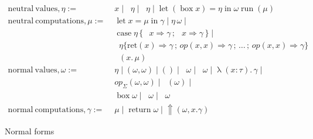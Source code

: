 \documentclass[acmsmall, screen, nonacm]{acmart}
\theoremstyle{definition}
\newcommand{\reflectname}{\Uparrow}
\newcommand{\performraw}[2]{\mathop{\reflectname(#1(#2))}}
\newcommand{\perform}[5]{\performraw{#1}{#2}(#3, #4. #5)}
\newcommand{\reifyname}{\Downarrow}
\newcommand{\reifyraw}[1]{\mathop{\reifyname_{#1}}}
\newcommand{\reify}[3]{\reifyraw{#1}(#2.\,#3)}
\newcommand{\outl}[1]{\mathop{\mathrm{out}_L} #1}
\newcommand{\outr}[1]{\mathop{\mathrm{out}_R} #1}
\newcommand{\indintro}[4]{#2_{#1}(#3, #4)}
\newcommand{\retname}{\mathrm{ret}}
\newcommand{\ret}[2]{\mathop{\retname_{#1}}(#2)}
\newcommand{\indelim}[3]{\mathop{\mathrm{rec}_{#1}} #2 \{#3\}}
\newcommand{\indretcase}[2]{\retname(#1) \Rightarrow #2}
\newcommand{\indcase}[4]{#1(#2, #3) \Rightarrow #4}
\newcommand{\seq}{\,;\,}
\newcommand{\fst}{\mathop{\pi_1}}
\newcommand{\snd}{\mathop{\pi_2}}
\newcommand{\inl}[1]{\mathop{\mathrm{in}_L} #1}
\newcommand{\inr}[1]{\mathop{\mathrm{in}_R} #1}
\newcommand{\case}[5]{\mathop{\mathrm{case}} #1 \,\{\,\inl{#2} \Rightarrow #3 \seq \inr{#4} \Rightarrow #5 \,\}}
\newcommand{\abs}[3]{\mathop{\lambda}(#1 \types #2).\,#3}
\newcommand{\app}[2]{#1\,#2}
\newcommand{\types}{\mathrel{:}}
\newcommand{\return}[1]{\mathop{\mathrm{return}} #1}
\newcommand{\letv}[3]{\mathop{\mathrm{let}} #1 = #2 \mathop{\mathrm{in}} #3}
\newcommand{\gbox}[1]{\mathop{\mathrm{box}} #1}
\newcommand{\gunbox}[4]{\mathop{\mathrm{let}} (\gbox #1) = #2 \mathop{\mathrm{in}} #3}
\newcommand{\grun}[1]{\mathop{\mathrm{run}}(#1)}
\begin{document}
\begin{figure}
\begin{align*}
  \mathrm{neutral\ values}, \eta :=\;& x \mid \fst \eta \mid \snd \eta
                                     \mid \gunbox{x}{\eta}{\omega} \mid \grun{\mu} \\
  \mathrm{neutral\ computations}, \mu :=\;& \letv{x}{\mu}{\gamma}
                                           \mid \app{\eta}{\omega} \mid \\
                                   & \case{\eta}{x}{\gamma}{x}{\gamma} \mid \\
                            & \indelim{\Sigma}{\eta}
                              {\indretcase{x}{\gamma} \seq
                               \indcase{op}{x}{x}{\gamma} \seq \ldots \seq
                               \indcase{op}{x}{x}{\gamma}} \\
                                   & \reify{\Sigma}{x}{\mu} \\
  \mathrm{normal\ values}, \omega :=\;& \eta \mid (\omega, \omega)
                           \mid () \mid \inl{\omega} \mid \inr{\omega} \mid \abs{x}{\tau}{\gamma} \mid \\
                           &\indintro{\Sigma}{op}{\omega}{\omega} \mid \ret{\Sigma}{\omega} \mid \\
                           &\gbox{\omega} \mid \outl{\omega} \mid \outr{\omega} \\
  \mathrm{normal\ computations}, \gamma :=\;& \mu \mid \return{\omega}
                                               \mid \perform{\eta}{op}{\omega}{x}{\gamma}
\end{align*}
\caption{Normal forms}
\label{fig:normal}
\end{figure}
\end{document}
